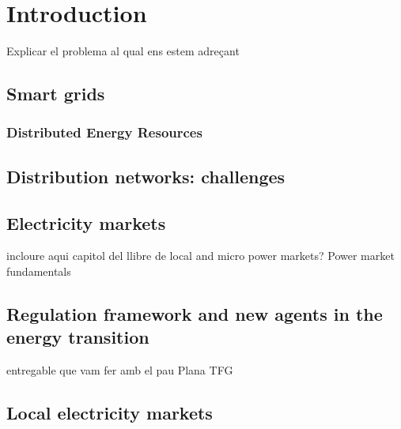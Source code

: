 \renewcommand\labelenumi{(\roman{enumi})}
\renewcommand\theenumi\labelenumi

\chapter{Introduction}
\label{chapterIntro}

Explicar el problema al qual ens estem adre\c{c}ant 

\section{Smart grids}

\subsection{Distributed Energy Resources} \label{subsec:DG}

\section{Distribution networks: challenges}

\section{Electricity markets}
incloure aqui capitol del llibre de local and micro power markets? 
Power market fundamentals 


\section{Regulation framework and new agents in the energy transition}
entregable que vam fer amb el pau Plana TFG

\section{Local electricity markets}

